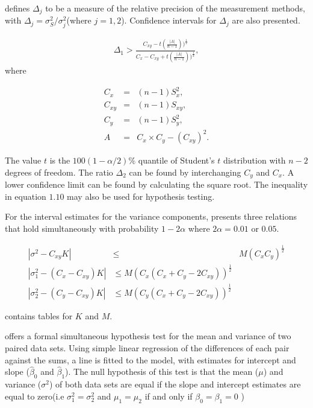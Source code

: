 \documentclass[12pt, a4paper]{report}
\theoremstyle{plain}
\theoremstyle{definition}
\theoremstyle{remark}
\begin{document}
		
		
		\citet{Thompson} defines $\Delta_{j}$ to be a measure of the
		relative precision of the measurement methods, with $\Delta_{j}=
		\sigma^2_{S}/\sigma^2_{j}$(where $j=1,2$). Confidence intervals
		for $\Delta_{j}$ are also presented.
		
		\begin{eqnarray}
		\Delta_{1} > \frac{C_{xy}-
			t(\frac{|A|}{n-1}))^{\frac{1}{2}}}{C_{x}-C_{xy}+
			t(\frac{|A|}{n-1}))^{\frac{1}{2}}},
		\end{eqnarray}
		where
		
		\begin{eqnarray}
		C_{x}&=&(n-1)S^2_{x},\nonumber\\
		C_{xy}&=&(n-1)S_{xy},\nonumber\\
		C_{y}&=&(n-1)S^2_{y},\nonumber\\
		A &=& C_{x}\times C_{y} - (C_{xy})^2 . \nonumber
		\end{eqnarray}
		
		The value $t$ is the $100(1-\alpha/2)\%$ quantile of Student's $t$
		distribution with $n-2$ degrees of freedom. The ratio $\Delta_{2}$
		can be found by interchanging $C_{y}$ and $C_{x}$. A lower
		confidence limit can be found by calculating the square root. The
		inequality in equation $1.10$ may also be used for hypothesis
		testing.
		
		For the interval estimates for the variance components,
		\citet{Thompson} presents three relations that hold simultaneously
		with probability $1-2\alpha$ where $2\alpha=0.01$ or $0.05$.
		
		
		\begin{eqnarray*}
			|\sigma^2-C_{xy}K| &\leqslant& M(C_{x}C_{y})^{\frac{1}{2}}\\
			|\sigma^2_{1}-(C_{x}-C_{xy})K|&\leqslant M(C_{x}(C_{x}+C_{y}-2C_{xy}))^{\frac{1}{2}}\nonumber\\
			|\sigma^2_{2}-(C_{y}-C_{xy})K|&\leqslant
			M(C_{y}(C_{x}+C_{y}-2C_{xy}))^{\frac{1}{2}}\nonumber
		\end{eqnarray*}
		
		\citet{Thompson} contains tables for $K$ and $M$.
		
		\citet{BB89} offers a formal simultaneous hypothesis test for the
		mean and variance of two paired data sets. Using simple linear
		regression of the differences of each pair against the sums, a
		line is fitted to the model, with estimates for intercept and
		slope ($\hat{\beta}_{0}$ and $\hat{\beta}_{1}$). The null
		hypothesis of this test is that the mean ($\mu$) and variance
		($\sigma^{2}$) of both data sets are equal if the slope and
		intercept estimates are equal to zero(i.e $\sigma^{2}_{1} =
		\sigma^{2}_{2}$ and $\mu_{1}=\mu_{2}$ if and only if $\beta_{0}=
		\beta_{1}=0$ )
		
\end{document}
